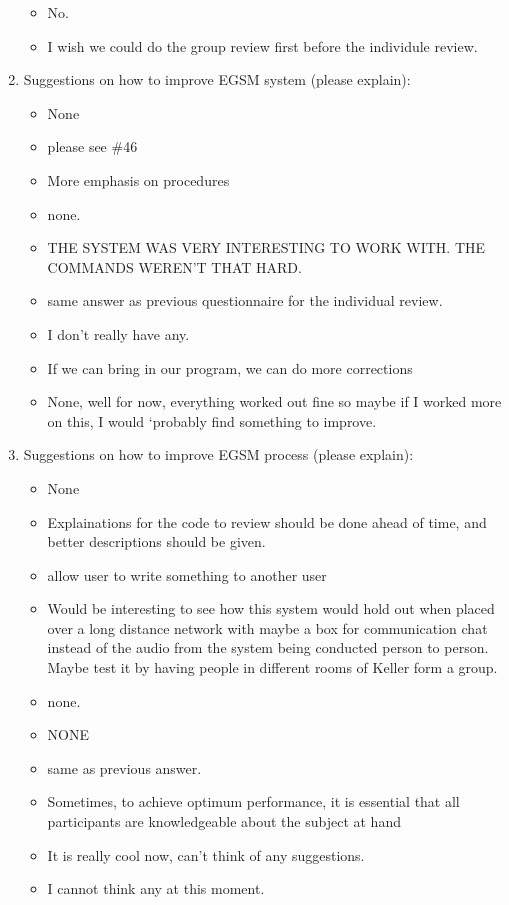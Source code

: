 \begin{enumerate}
\begin{itemize}
\item No.
\item I wish we could do the group review first before the individule review.
\end{itemize}

\item Suggestions on how to improve EGSM system (please explain):
\begin{itemize}
\item None
\item please see \#46
\item More emphasis on procedures
\item none.
\item THE SYSTEM WAS VERY INTERESTING TO WORK WITH.  THE COMMANDS WEREN'T
THAT HARD.
\item same answer as previous questionnaire for the individual review.

\item I don't really have any.
\item If we can bring in our program, we can do more corrections
\item None, well for now, everything worked out fine
so maybe if I worked more on this, I would `probably find
something to improve.
\end{itemize}


\item Suggestions on how to improve EGSM process (please explain):
\begin{itemize}
\item None
\item Explainations for the code to review should be done ahead of time, and
better descriptions should be given.
\item allow user to write something to another user

\item Would be interesting to see how this system would hold out when placed
over a long distance network with maybe a box for communication chat
instead of the audio from the system being conducted person to person.
Maybe test it by having people in different rooms of Keller form a group.
\item none.

\item NONE
\item same as previous answer.


\item Sometimes, to achieve optimum performance, it is essential that all
participants are knowledgeable about the subject at hand
\item It is really cool now, can't think of any suggestions.
\item I cannot think any at this moment.
\end{itemize}


\end{enumerate}
